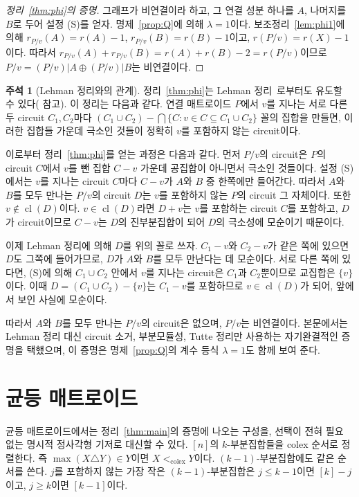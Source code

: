 \documentclass[11pt,a4paper]{article}
\theoremstyle{plain}
\theoremstyle{definition}
\newtheorem{remark}[theorem]{주석}
\newcommand{\cl}{\operatorname{cl}}
\newcommand{\colex}{<_{\mathrm{colex}}}
\begin{document}
\begin{proof}[정리~\ref{thm:phi}의 증명]
그래프가 비연결이라 하고, 그 연결 성분 하나를 $A$, 나머지를 $B$로 두어 설정 (S)를 얻자. 명제~\ref{prop:Q}에 의해 $\lambda=1$이다. 보조정리~\ref{lem:phi1}에 의해 $r_{P/v}(A)=r(A)-1$, $r_{P/v}(B)=r(B)-1$이고, $r(P/v)=r(X)-1$이다. 따라서 $r_{P/v}(A)+r_{P/v}(B)=r(A)+r(B)-2=r(P/v)$이므로 $P/v=(P/v)|A\oplus(P/v)|B$는 비연결이다.
\end{proof}

\begin{remark}[Lehman 정리와의 관계]\label{rem:lehman}
정리~\ref{thm:phi}는 Lehman 정리~\cite{Le64}로부터도 유도할 수 있다(\cite[\S4.3]{Ox11} 참고). 이 정리는 다음과 같다. 연결 매트로이드 $P$에서 $v$를 지나는 서로 다른 두 circuit $C_1,C_2$마다 $(C_1\cup C_2)-\bigcap\{C: v\in C\subseteq C_1\cup C_2\}$ 꼴의 집합을 만들면, 이러한 집합들 가운데 극소인 것들이 정확히 $v$를 포함하지 않는 circuit이다.

이로부터 정리~\ref{thm:phi}를 얻는 과정은 다음과 같다. 먼저 $P/v$의 circuit은 $P$의 circuit $C$에서 $v$를 뺀 집합 $C-v$ 가운데 공집합이 아니면서 극소인 것들이다. 설정 (S)에서는 $v$를 지나는 circuit $C$마다 $C-v$가 $A$와 $B$ 중 한쪽에만 들어간다. 따라서 $A$와 $B$를 모두 만나는 $P/v$의 circuit $D$는 $v$를 포함하지 않는 $P$의 circuit 그 자체이다. 또한 $v\notin\cl(D)$이다. $v\in\cl(D)$라면 $D+v$는 $v$를 포함하는 circuit $C$를 포함하고, $D$가 circuit이므로 $C-v$는 $D$의 진부분집합이 되어 $D$의 극소성에 모순이기 때문이다.

이제 Lehman 정리에 의해 $D$를 위의 꼴로 쓰자. $C_1-v$와 $C_2-v$가 같은 쪽에 있으면 $D$도 그쪽에 들어가므로, $D$가 $A$와 $B$를 모두 만난다는 데 모순이다. 서로 다른 쪽에 있다면, (S)에 의해 $C_1\cup C_2$ 안에서 $v$를 지나는 circuit은 $C_1$과 $C_2$뿐이므로 교집합은 $\{v\}$이다. 이때 $D=(C_1\cup C_2)-\{v\}$는 $C_1-v$를 포함하므로 $v\in\cl(D)$가 되어, 앞에서 보인 사실에 모순이다.

따라서 $A$와 $B$를 모두 만나는 $P/v$의 circuit은 없으며, $P/v$는 비연결이다. 본문에서는 Lehman 정리 대신 circuit 소거, 부분모듈성, Tutte 정리만 사용하는 자기완결적인 증명을 택했으며, 이 증명은 명제~\ref{prop:Q}의 계수 등식 $\lambda=1$도 함께 보여 준다.
\end{remark}

\section{균등 매트로이드}\label{sec:uniform}
균등 매트로이드에서는 정리~\ref{thm:main}의 증명에 나오는 구성을, 선택이 전혀 필요 없는 명시적 정사각형 기저로 대신할 수 있다. $[n]$의 $k$\nobreakdash-부분집합들을 colex 순서로 정렬한다. 즉 $\max(X\triangle Y)\in Y$이면 $X\colex Y$이다. $(k-1)$\nobreakdash-부분집합에도 같은 순서를 쓴다. $j$를 포함하지 않는 가장 작은 $(k-1)$\nobreakdash-부분집합은 $j\le k-1$이면 $[k]-j$이고, $j\ge k$이면 $[k-1]$이다.
\end{document}
